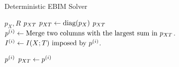 
\begin{algorithm}[!h]
\caption{Deterministic EBIM Solver}\label{ch3:alg:search}
\begin{spacing}{1.2}
\begin{algorithmic}[1]
    \Require $p_X, R$
    \Ensure $p_{XT}$
    \State $p_{XT} \gets \text{diag}(p_X)$ 
        \State \Return $p_{XT}$
    \EndIf
        \State $p^{(i)} \gets \text{Merge two columns with the largest sum in } p_{XT}$.
        \State $I^{(i)} \gets  I(X;T) \text{ imposed by } p^{(i)}$. \label{ch3:alg:Il}
        
            \State \Return $p^{(i)}$
        \Else
            \State $p_{XT} \gets p^{(i)}$
        \EndIf
    \EndFor    
\end{algorithmic}
\end{spacing}
\end{algorithm}
\FloatBarrier

